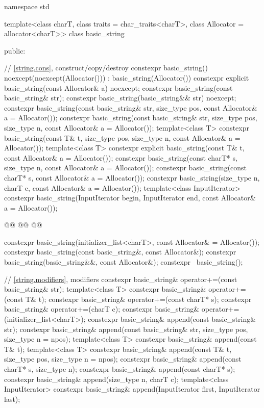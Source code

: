 \documentclass{wg21}
\begin{document}
\begin{codeblock}
namespace std {
    template<class charT, class traits = char_traits<charT>, class Allocator = allocator<charT>>
    class basic_string {
        public:

        // \ref{string.cons}, construct/copy/destroy
        constexpr basic_string() noexcept(noexcept(Allocator())) : basic_string(Allocator()) { }
        constexpr explicit basic_string(const Allocator& a) noexcept;
        constexpr basic_string(const basic_string& str);
        constexpr basic_string(basic_string&& str) noexcept;
        constexpr basic_string(const basic_string& str, size_type pos,
        const Allocator& a = Allocator());
        constexpr basic_string(const basic_string& str, size_type pos, size_type n,
        const Allocator& a = Allocator());
        template<class T>
        constexpr basic_string(const T& t, size_type pos, size_type n,
        const Allocator& a = Allocator());
        template<class T>
        constexpr explicit basic_string(const T& t, const Allocator& a = Allocator());
        constexpr basic_string(const charT* s, size_type n, const Allocator& a = Allocator());
        constexpr basic_string(const charT* s, const Allocator& a = Allocator());
        constexpr basic_string(size_type n, charT c, const Allocator& a = Allocator());
        template<class InputIterator>
        constexpr basic_string(InputIterator begin, InputIterator end, const Allocator& a = Allocator());

        @@
        @@
        @@

        constexpr basic_string(initializer_list<charT>, const Allocator& = Allocator());
        constexpr basic_string(const basic_string&, const Allocator&);
        constexpr basic_string(basic_string&&, const Allocator&);
        constexpr ~basic_string();

        // \ref{string.modifiers}, modifiers
        constexpr basic_string& operator+=(const basic_string& str);
        template<class T>
        constexpr basic_string& operator+=(const T& t);
        constexpr basic_string& operator+=(const charT* s);
        constexpr basic_string& operator+=(charT c);
        constexpr basic_string& operator+=(initializer_list<charT>);
        constexpr basic_string& append(const basic_string& str);
        constexpr basic_string& append(const basic_string& str, size_type pos, size_type n = npos);
        template<class T>
        constexpr basic_string& append(const T& t);
        template<class T>
        constexpr basic_string& append(const T& t, size_type pos, size_type n = npos);
        constexpr basic_string& append(const charT* s, size_type n);
        constexpr basic_string& append(const charT* s);
        constexpr basic_string& append(size_type n, charT c);
        template<class InputIterator>
        constexpr basic_string& append(InputIterator first, InputIterator last);

}}
\end{codeblock}
\end{document}
